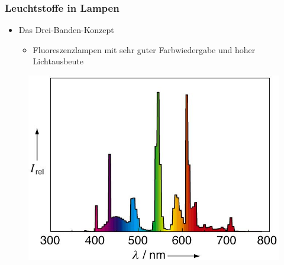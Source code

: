 \documentclass{beamer}
\begin{document}
\begin{frame}[t]\frametitle{\small Leuchtstoffe in Lampen}
  \begin{itemize}
    \item Das Drei-Banden-Konzept
          \begin{itemize}
            \item \footnotesize Fluoreszenzlampen mit sehr guter Farbwiedergabe und hoher Lichtausbeute
          \end{itemize}
  \end{itemize}

\begin{figure}[!h]
\centering
      \includegraphics[scale=0.2]{pics/dd.jpg}
      \caption*{\footnotesize {} }
 \end{figure}


\end{frame}
\end{document}
